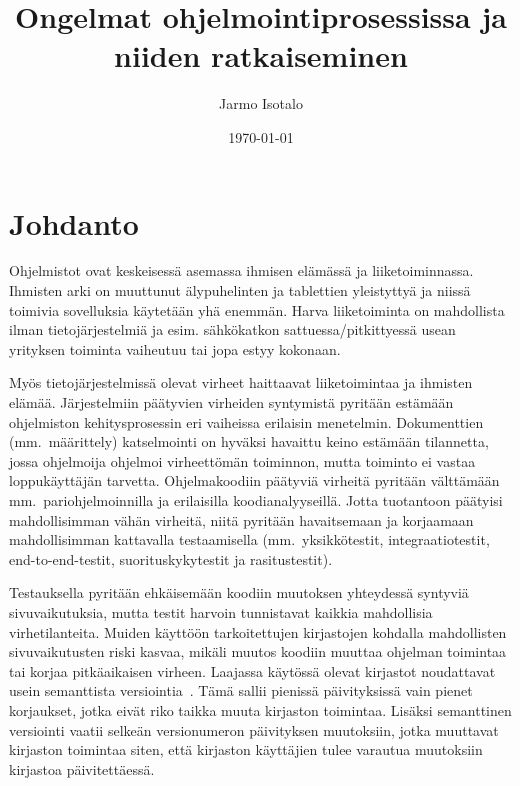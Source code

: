 \documentclass[finnish]{tktltiki2}
\title{Ongelmat ohjelmointiprosessissa ja niiden ratkaiseminen}
\author{Jarmo Isotalo}
\date{\today}
\theoremstyle{definition}
\theoremstyle{remark}
\begin{document}

\frontmatter      %

\maketitle        %
\makeabstract     %

\tableofcontents  %


\mainmatter       %

\section{Johdanto}

Ohjelmistot ovat keskeisessä asemassa ihmisen elämässä ja liiketoiminnassa. Ihmisten arki on muuttunut älypuhelinten ja tablettien yleistyttyä ja niissä toimivia sovelluksia käytetään yhä enemmän. Harva liiketoiminta on mahdollista ilman tietojärjestelmiä ja esim. sähkökatkon sattuessa/pitkittyessä usean yrityksen toiminta vaiheutuu tai jopa estyy kokonaan.

Myös tietojärjestelmissä olevat virheet haittaavat liiketoimintaa ja ihmisten elämää. Järjestelmiin päätyvien virheiden syntymistä pyritään estämään ohjelmiston kehitysprosessin eri vaiheissa erilaisin menetelmin. Dokumenttien (mm.\ määrittely) katselmointi on hyväksi havaittu keino estämään tilannetta, jossa ohjelmoija ohjelmoi virheettömän toiminnon, mutta toiminto ei vastaa loppukäyttäjän tarvetta. Ohjelmakoodiin päätyviä virheitä pyritään välttämään mm.\ pariohjelmoinnilla ja erilaisilla koodianalyyseillä. Jotta tuotantoon päätyisi mahdollisimman vähän virheitä, niitä pyritään havaitsemaan ja korjaamaan mahdollisimman kattavalla testaamisella (mm.\ yksikkötestit, integraatiotestit, end-to-end-testit, suorituskykytestit ja rasitustestit).

Testauksella pyritään ehkäisemään koodiin muutoksen yhteydessä syntyviä sivuvaikutuksia, mutta testit harvoin tunnistavat kaikkia mahdollisia virhetilanteita.
Muiden käyttöön tarkoitettujen kirjastojen kohdalla mahdollisten sivuvaikutusten riski kasvaa, mikäli muutos koodiin muuttaa ohjelman toimintaa tai korjaa pitkäaikaisen virheen.
Laajassa käytössä olevat kirjastot noudattavat usein semanttista versiointia~\cite{semver}. Tämä sallii pienissä päivityksissä vain pienet korjaukset, jotka eivät riko taikka muuta kirjaston toimintaa. Lisäksi semanttinen versiointi vaatii selkeän versionumeron päivityksen muutoksiin, jotka muuttavat kirjaston toimintaa siten, että kirjaston käyttäjien tulee varautua muutoksiin kirjastoa päivitettäessä.
\end{document}
